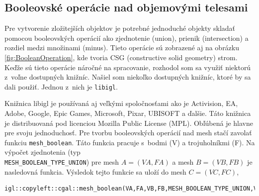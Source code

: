 






\subsection*{Booleovské operácie nad objemovými telesami}
\label{sec:CSG}
Pre vytvorenie zložitejších objektov je potrebné jednoduché objekty skladať pomocou booleovských operácií ako zjednotenie (union), prienik (intersection) a rozdiel medzi množinami (minus). Tieto operácie sú zobrazené aj na obrázku \ref{fig:BooleanOperation}, kde tvoria CSG (constructive solid geometry) strom. Keďže sú tieto operácie náročné na spracovanie, rozhodol som sa využiť niektorú z~voľne dostupných knižníc. Našiel som niekoľko dostupných knižníc, ktoré by sa dali použiť. Jednou z~nich je \texttt{libigl}\cite{libigl}.

Knižnica libigl je používaná aj veľkými spoločnosťami ako je Activision, EA, Adobe, Google, Epic Games, Microsoft, Pixar, UBISOFT a ďalšie. Táto knižnica je distribuovaná pod licenciou Mozilla Public License (MPL).
Obľúbená je hlavne pre svoju jednoduchosť. Pre tvorbu booleovských operácií nad mesh stačí zavolať funkciu \texttt{mesh\_boolean}.
Táto funkcia pracuje s~bodmi (V) a trojuholníkmi (F). Na výpočet zjednotenia (typ \\ \texttt{MESH\_BOOLEAN\_TYPE\_UNION}) pre mesh $A=(VA,FA)$ a mesh $B=(VB,FB)$ je nasledovná funkcia. Výsledok tejto funkcie sa uloží do mesh $C=(VC,FC)$,

\begin{lstlisting}
igl::copyleft::cgal::mesh_boolean(VA,FA,VB,FB,MESH_BOOLEAN_TYPE_UNION,VC,FC);
\end{lstlisting}


